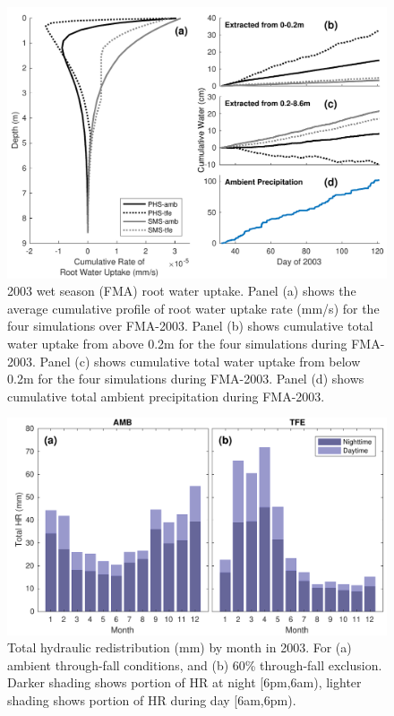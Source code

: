 \documentclass[draft,linenumbers]{agujournal}
\begin{document}
        \clearpage
    \begin{figure}[h]
     \centering
     \includegraphics[width=30pc]{../figs2/fig8.pdf}
     \caption{2003 wet season (FMA) root water uptake. 
     Panel (a) shows the average cumulative profile of root water uptake rate (mm/s) for the four simulations over FMA-2003.
     Panel (b) shows cumulative total water uptake from above 0.2m for the four simulations during FMA-2003.
     Panel (c) shows cumulative total water uptake from below 0.2m for the four simulations during FMA-2003. 
     Panel (d) shows cumulative total ambient precipitation during FMA-2003. 
     }
     \label{fig8}
  \end{figure}
  
    \clearpage
    \begin{figure}[h]
     \centering
     \includegraphics[width=30pc]{../figs2/fig9.pdf}
     \caption{Total hydraulic redistribution (mm) by month in 2003. For (a) ambient through-fall conditions, and (b) 60\% through-fall exclusion. 
     Darker shading shows portion of HR at night [6pm,6am), lighter shading shows portion of HR during day [6am,6pm).}
     \label{fig:hr}
  \end{figure}
\end{document}
